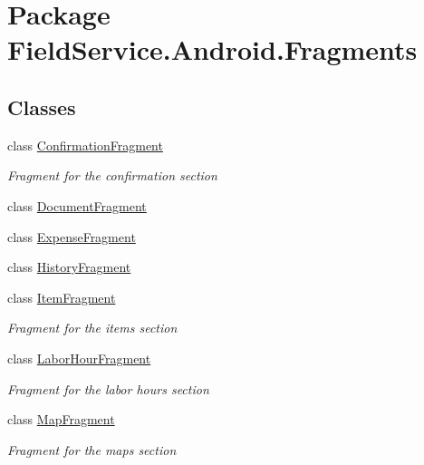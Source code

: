 \hypertarget{namespace_field_service_1_1_android_1_1_fragments}{\section{Package Field\+Service.\+Android.\+Fragments}
\label{namespace_field_service_1_1_android_1_1_fragments}
}
\subsection*{Classes}
\begin{DoxyCompactItemize}
\item 
class \hyperlink{class_field_service_1_1_android_1_1_fragments_1_1_confirmation_fragment}{Confirmation\+Fragment}
\begin{DoxyCompactList}\small\item\em Fragment for the confirmation section \end{DoxyCompactList}\item 
class \hyperlink{class_field_service_1_1_android_1_1_fragments_1_1_document_fragment}{Document\+Fragment}
\item 
class \hyperlink{class_field_service_1_1_android_1_1_fragments_1_1_expense_fragment}{Expense\+Fragment}
\item 
class \hyperlink{class_field_service_1_1_android_1_1_fragments_1_1_history_fragment}{History\+Fragment}
\item 
class \hyperlink{class_field_service_1_1_android_1_1_fragments_1_1_item_fragment}{Item\+Fragment}
\begin{DoxyCompactList}\small\item\em Fragment for the items section \end{DoxyCompactList}\item 
class \hyperlink{class_field_service_1_1_android_1_1_fragments_1_1_labor_hour_fragment}{Labor\+Hour\+Fragment}
\begin{DoxyCompactList}\small\item\em Fragment for the labor hours section \end{DoxyCompactList}\item 
class \hyperlink{class_field_service_1_1_android_1_1_fragments_1_1_map_fragment}{Map\+Fragment}
\begin{DoxyCompactList}\small\item\em Fragment for the maps section \end{DoxyCompactList}\item 

\end{DoxyCompactItemize}
